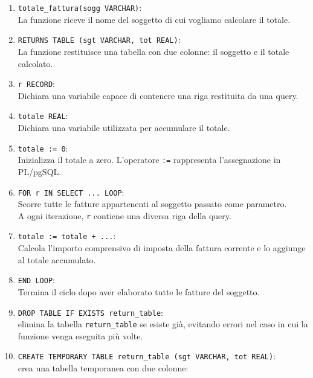 \begin{enumerate}
    \item \texttt{totale\_fattura(sogg VARCHAR)}:\\
    La funzione riceve il nome del soggetto
    di cui vogliamo calcolare il totale.

    \item \texttt{RETURNS TABLE (sgt VARCHAR, tot REAL)}:\\
    La funzione restituisce una tabella con due colonne:
    il soggetto e il totale calcolato.

    \item \texttt{r RECORD}:\\
    Dichiara una variabile capace di contenere
    una riga restituita da una query.

    \item \texttt{totale REAL}:\\
    Dichiara una variabile utilizzata
    per accumulare il totale.

    \item \texttt{totale := 0}:\\
    Inizializza il totale a zero.
    L'operatore \texttt{:=} rappresenta
    l'assegnazione in PL/pgSQL.

    \item \texttt{FOR r IN SELECT ... LOOP}:\\
    Scorre tutte le fatture appartenenti
    al soggetto passato come parametro.\\
    A ogni iterazione, \texttt{r} contiene
    una diversa riga della query.

    \item \texttt{totale := totale + ...}:\\
    Calcola l'importo comprensivo di imposta
    della fattura corrente e lo aggiunge
    al totale accumulato.

    \item \texttt{END LOOP}:\\
    Termina il ciclo dopo aver elaborato
    tutte le fatture del soggetto.

    \item \texttt{DROP TABLE IF EXISTS return\_table}:\\
     elimina la tabella \texttt{return\_table} se esiste già, evitando errori nel caso in cui la funzione venga eseguita più volte.

    \item \texttt{CREATE TEMPORARY TABLE return\_table (sgt VARCHAR, tot REAL)}:\\
     crea una tabella temporanea con due colonne:


\end{enumerate}

